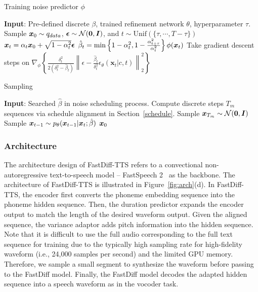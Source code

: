     \begin{algorithm}[ht]
        \centering
        \caption{Training noise predictor $\phi$}\label{alg: training_noise}
        \begin{algorithmic}[1]
        \STATE \textbf{Input}: Pre-defined discrete $\beta$, trained refinement network $\theta$, hyperparameter $\tau$.
        \REPEAT 
        \STATE Sample ${\bm{x}}_{0} \sim q_{data}$, ${\boldsymbol{\epsilon}}\sim{\mathcal{N}}({\bm{0}},{\bm{I}})$, and $t\sim\mathrm{Unif}(\{\tau,\cdots,T-\tau\})$
        \STATE ${\bm{x}}_t = \alpha_{t} {\bm{x}}_{0}+ \sqrt{1-\alpha_{t}^2} {\boldsymbol{\epsilon}}$
        \STATE $\hat{\beta}_{t}=\min \left\{1-\alpha_{t}^2, 1-\frac{\alpha_{t+\tau}^{2}}{\alpha_{t}^{2}}\right\} \phi({\bm{x}}_{t})$
        \STATE Take gradient descent steps on $\nabla_{\phi}\left\{\frac{\delta_{t}^{2}}{2\left(\delta_{t}^{2}-\hat{\beta}_{t}\right)}\left\|\epsilon-\frac{\hat{\beta}_{t}}{\delta_{t}^{2}} \epsilon_{\theta}\left(\boldsymbol{x}_{t}|c, t\right)\right\|_{2}^{2}\right\}$ 
        \end{algorithmic}
        \end{algorithm}
\begin{algorithm}[ht]
    \centering
    \caption{Sampling}\label{alg: sampling}
    \begin{algorithmic}[1]
     \STATE \textbf{Input}: Searched $\hat{\beta}$ in noise scheduling process.
    \STATE Compute discrete steps $T_m$ sequences via schedule alignment in Section~\ref{schedule}.
    \STATE Sample ${\bm{x}}_{T_m} \sim {\mathcal{N}}({\bm{0}},{\bm{I}})$
    \STATE Sample ${\bm{x}}_{t-1}\sim p_{\theta}({\bm{x}}_{t-1}|{\bm{x}}_t;\hat{\beta})$
    \ENDFOR
    \RETURN ${\bm{x}}_0$
    \end{algorithmic}
    \end{algorithm}
    
\subsubsection{Architecture}
The architecture design of FastDiff-TTS refers to a convectional non-autoregressive text-to-speech model -- FastSpeech 2~\cite{ren2020fastspeech} as the backbone. The architecture of FastDiff-TTS is illustrated in Figure~\ref{fig:arch}(d). In FastDiff-TTS, the encoder first converts the phoneme embedding sequence into the phoneme hidden sequence. Then, the duration predictor expands the encoder output to match the length of the desired waveform output. Given the aligned sequence, the variance adaptor adds pitch information into the hidden sequence. Note that it is difficult to use the full audio corresponding to the full text sequence for training due to the typically high sampling rate for high-fidelity waveform (i.e., 24,000 samples per second) and the limited GPU memory. Therefore, we sample a small segment to synthesize the waveform before passing to the FastDiff model. Finally, the FastDiff model decodes the adapted hidden sequence into a speech waveform as in the vocoder task.

